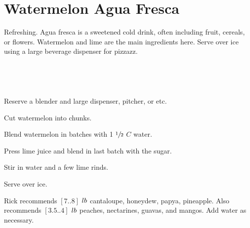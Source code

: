 \section{Watermelon Agua Fresca}

\begin{recipestats}[
        servings=16,
        preptime=15~\minute,
        original=\citeauthor{baylessWatermelon}\cite{baylessWatermelon},
    ]
\end{recipestats}

\begin{recipeabstract}
    Refreshing.
    Agua fresca is a sweetened cold drink, often including fruit, cereals, or flowers.
    Watermelon and lime are the main ingredients here.
    Serve over ice using a large beverage dispenser for pizzazz.
\end{recipeabstract}

\begin{ingredientcolumns}
    \begin{ingredientblock}
        \\
    \end{ingredientblock}
    \begin{ingredientblock}
        \\
    \end{ingredientblock}
\end{ingredientcolumns}

\begin{preparation}
\item Reserve a blender and large dispenser, pitcher, or etc.
\item Cut watermelon into chunks.
\item Blend watermelon in batches with 1 $\sfrac{1}{2}$ $C$ water.
\item Press lime juice and blend in last batch with the sugar.
\item Stir in water and a few lime rinds.
\item Serve over ice.
\end{preparation}

\begin{variation}
\item Rick recommends $[7..8]$ $lb$ cantaloupe, honeydew, papya,
    pineapple. Also recommends $[3.5..4]$ $lb$ peaches, nectarines,
    guavas, and mangos.
    Add water as necessary.
\end{variation}

\recipeend%
